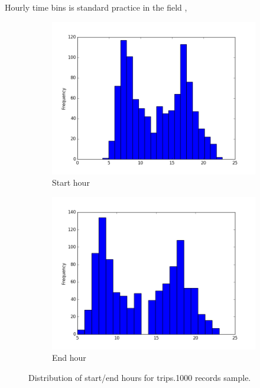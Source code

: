 \documentclass{article}
\begin{document}
Hourly time bins is standard practice in the field \cite{langlois2016inferring} \cite{ma2017understanding}, 

\begin{figure}[H]
  \centering
  \begin{subfigure}[b]{.45\textwidth}
  	\centering
  	\includegraphics[width=\linewidth]{./images/start_hour_hist.png}
  	\caption{Start hour}
  \end{subfigure}
  \begin{subfigure}[b]{.45\textwidth}
  	\centering
  	\includegraphics[width=\linewidth]{./images/end_hour_hist.png}
  	\caption{End hour}
  \end{subfigure}
  \caption{Distribution of start/end hours for trips.1000 records sample.}
  	\label{fig:preprocessing/start_end_hour}
\end{figure}
\end{document}
